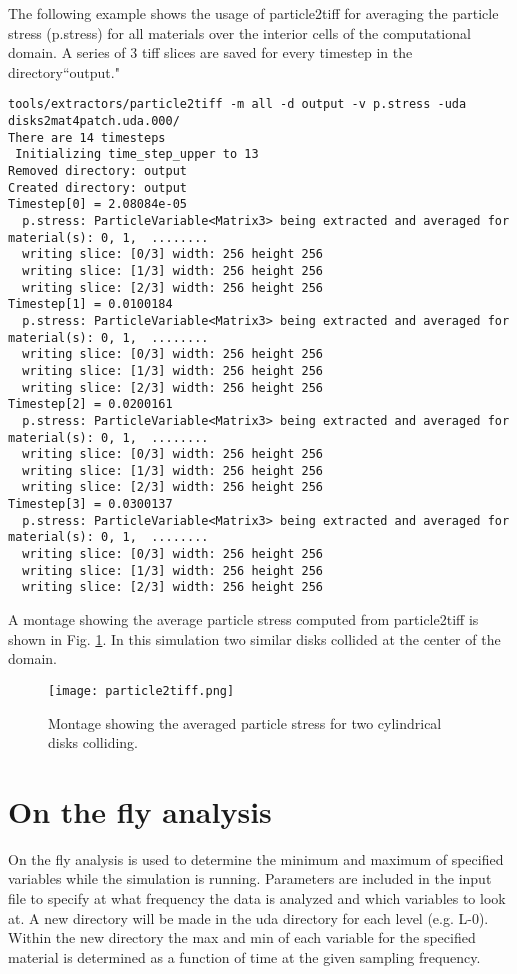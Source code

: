 The following example shows the usage of particle2tiff for averaging the particle stress (p.stress)
for all materials over the interior cells of the computational domain.  A series of 3 tiff slices
are saved for every timestep in the directory``output."
\begin{Verbatim}[fontsize=\scriptsize]
tools/extractors/particle2tiff -m all -d output -v p.stress -uda disks2mat4patch.uda.000/
There are 14 timesteps
 Initializing time_step_upper to 13
Removed directory: output
Created directory: output
Timestep[0] = 2.08084e-05
  p.stress: ParticleVariable<Matrix3> being extracted and averaged for material(s): 0, 1,  ........
  writing slice: [0/3] width: 256 height 256
  writing slice: [1/3] width: 256 height 256
  writing slice: [2/3] width: 256 height 256
Timestep[1] = 0.0100184
  p.stress: ParticleVariable<Matrix3> being extracted and averaged for material(s): 0, 1,  ........
  writing slice: [0/3] width: 256 height 256
  writing slice: [1/3] width: 256 height 256
  writing slice: [2/3] width: 256 height 256
Timestep[2] = 0.0200161
  p.stress: ParticleVariable<Matrix3> being extracted and averaged for material(s): 0, 1,  ........
  writing slice: [0/3] width: 256 height 256
  writing slice: [1/3] width: 256 height 256
  writing slice: [2/3] width: 256 height 256
Timestep[3] = 0.0300137
  p.stress: ParticleVariable<Matrix3> being extracted and averaged for material(s): 0, 1,  ........
  writing slice: [0/3] width: 256 height 256
  writing slice: [1/3] width: 256 height 256
  writing slice: [2/3] width: 256 height 256
\end{Verbatim}
A montage showing the average particle stress computed from particle2tiff is shown
in Fig. \ref{fig:p2tiff}.  In this simulation two similar disks collided at the center of the domain.
\vspace{-0.5in}
\begin{figure}
  \texttt{[image: particle2tiff.png]}
  \caption{Montage showing the averaged particle stress for two cylindrical disks colliding.}
  \label{fig:p2tiff}
\end{figure}


\section{On the fly analysis}
On the fly analysis is used to determine the minimum and maximum of specified variables while the simulation is running.  Parameters are included in the input file to specify at what frequency the data is analyzed and which variables to look at. A new directory will be made in the uda directory for each level (e.g. L-0). Within the new directory the max and min of each variable for the specified material is determined as a function of time at the given sampling frequency.


